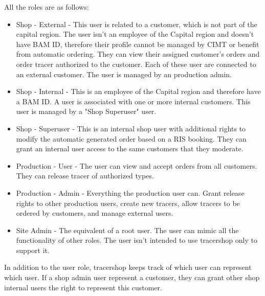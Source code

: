 \documentclass{article}
\begin{document}
All the roles are as follows:

\begin{itemize}
  \item Shop - External - This user is related to a customer, which is not part
  of the capital region. The user isn't an employee of the Capital region and
  doesn't have BAM ID, therefore their profile cannot be managed by CIMT or
  benefit from automatic ordering.
  They can view their assigned customer's orders and order tracer authorized to
  the customer.
  Each of these user are connected to an external customer. The user is managed
  by an production admin.
  \item Shop - Internal - This is an employee of the Capital region and
  therefore have a BAM ID. A user is associated with one or more internal
  customers. This user is managed by a "Shop Superuser" user.
  \item Shop - Superuser - This is an internal shop user with additional rights
  to modify the automatic generated order based on a RIS booking.
  They can grant an internal user access to the same customers that they
  moderate.
  \item Production - User - The user can view and accept orders from all
  customers. They can release tracer of authorized types.
  \item Production - Admin - Everything the production user can. Grant release
  rights to other production users, create new tracers, allow tracers to be
  ordered by customers, and manage external users.
  \item Site Admin - The equivalent of a root user. The user can mimic all the
  functionality of other roles. The user isn't intended to use tracershop only
  to support it.
\end{itemize}

In addition to the user role, tracershop keeps track of which user can represent
which user. If a shop admin user represent a customer, they can grant other
shop internal users the right to represent this customer.
\end{document}
